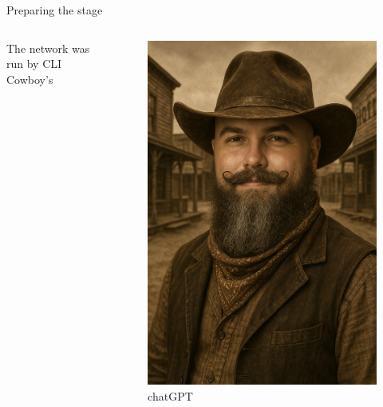\documentclass[aspectratio=169]{beamer}
\begin{document}
\begin{frame}{Preparing the stage}

  \begin{columns}
    \begin{column}{0.4\textwidth}
      The network was run by CLI Cowboy's
    \end{column}
    \begin{column}{0.4\textwidth}
      \begin{figure}
        \includegraphics[height = 0.7\textheight]{images/urs_cowboy.png}
        \caption{\footnotesize chatGPT}
      \end{figure}
    \end{column}
  \end{columns}

\end{frame}
\end{document}
